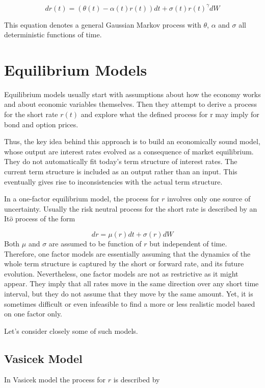 $$dr(t) = (\theta(t) − \alpha(t)r(t)) dt + \sigma(t)r(t)^{\gamma} dW$$

This equation denotes a general Gaussian Markov process with $\theta$, $\alpha$ and $\sigma$
all deterministic functions of time.

\section{Equilibrium Models}\label{equilibrium-models}

Equilibrium models usually start with assumptions about how the economy works and about economic 
variables themselves. Then they attempt to derive a process 
for the short rate $r(t)$ and explore what the defined process 
for r may imply for bond and option prices.

Thus, the key idea behind this approach is to build an economically 
sound model, whose output are interest rates evolved as a consequence 
of market equilibrium.
They do not automatically fit today’s term structure of interest rates. 
The current term structure is included as an output rather than an input. 
This eventually gives rise to inconsistencies with the actual term structure. 

In a one-factor equilibrium model, the process for \(r\) involves only
one source of uncertainty. Usually the risk neutral process for the
short rate is described by an It\(\hat{o}\) process of the form

\[dr = \mu(r)dt + \sigma(r)dW\]
Both \(\mu\) and \(\sigma\) are assumed to be function of \(r\) but independent of time.
Therefore, one factor models are essentially assuming that the dynamics of the whole term structure is 
captured by the short or forward rate, and its future evolution. Nevertheless, 
one factor models are not as restrictive as it might appear. They imply 
that all rates move in the same direction over any short time interval, 
but they do not assume that they move by the same amount.
Yet, it is sometimes difficult or even infeasible to find a more or less 
realistic model based on one factor only.

Let's consider closely some of such models.

\subsection{Vasicek Model}\label{vasicek-model}

In Vasicek model the process for \(r\) is described by

